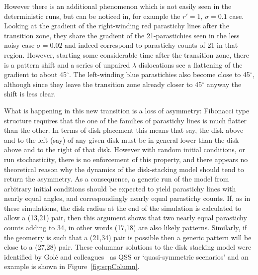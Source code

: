 However there is an additional phenomenon which is not easily seen in the deterministic runs, but can be noticed in, for example the $r'=1$, $\sigma=0.1$ case. Looking at the gradient of the right-winding red parastichy lines after the transition zone, they share the gradient of the 21-parastichies seen in the less noisy case $\sigma=0.02$ and indeed correspond to parastichy counts of 21 in that region. However, starting some considerable time after the transition zone, there is a pattern shift and a series of unpaired $\lambda$ dislocations see a flattening of the gradient to about 45$^\circ$. The left-winding blue parastichies  also  become close to 45$^\circ$, although since they leave the transition zone already closer to 45$^\circ$ anyway the shift is less clear. 

What is happening in this new transition is a loss of asymmetry:  Fibonacci type structure requires that the one of the families of parastichy lines is much flatter than the other. In terms of disk placement this means that say, the disk above and to the left (say) of any given disk must be in general lower than the disk above and to the right of that disk. However with random initial conditions, or run stochasticity, there is no enforcement of this property, and there appears no theoretical reason why the dynamics of the disk-stacking model should tend to return the asymmetry. As a consequence, a generic run of the model from arbitrary initial conditions should be expected to yield parastichy lines with nearly equal angles, and correspondingly nearly equal parastichy counts. If, as in these simulations, the disk radius at the end of the simulation is calculated to allow a (13,21) pair, then this argument shows that two nearly equal parastichy counts adding to 34, in other words (17,18) are also likely patterns. Similarly, if the geometry is such that a (21,34) pair is possible then a generic pattern will be close to a (27,28) pair. These columnar solutions to the disk stacking model were identified by Gol\'e and colleagues~\cite{goleFibonacciQuasisymmetricPhyllotaxis2016} as QSS or `quasi-symmetric scenarios'  and an example is shown in Figure~\ref{fig:scpColumn}.

